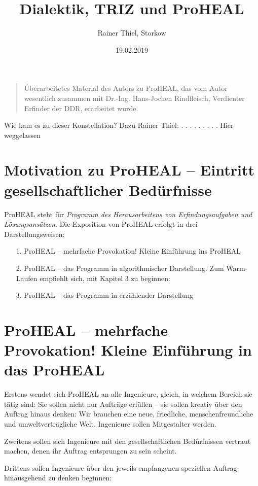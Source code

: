 \documentclass[12pt,a4paper]{article}
\title{Dialektik, TRIZ und ProHEAL}
\author{Rainer Thiel, Storkow}
\date{19.02.2019}
\begin{document}
\maketitle
\begin{quote}
  Überarbeitetes Material des Autors zu ProHEAL, das vom Autor wesentlich
  zusammen mit Dr.-Ing. Hans-Jochen Rindfleisch, Verdienter Erfinder der DDR,
  erarbeitet wurde.
\end{quote}
\tableofcontents

Wie kam es zu dieser Konstellation?
Dazu Rainer Thiel: . . . . . . . . . Hier weggelassen

\section*{Motivation zu ProHEAL -- Eintritt gesellschaftlicher Bedürfnisse}

ProHEAL steht für \emph{Programm des Herausarbeitens von Erfindungsaufgaben und
  Lösungsansätzen}. Die Exposition von ProHEAL erfolgt in drei
Darstellungsweisen:
\begin{itemize}
\item [1.] ProHEAL – mehrfache Provokation! Kleine Einführung ins ProHEAL
\item [2.] ProHEAL – das Programm in algorithmischer Darstellung. Zum
  Warm-Laufen empfiehlt sich, mit Kapitel 3 zu beginnen:
\item [3.] ProHEAL – das Programm in erzählender Darstellung
\end{itemize}

\section{ProHEAL – mehrfache Provokation! Kleine Einführung in das ProHEAL}

Erstens wendet sich ProHEAL an alle Ingenieure, gleich, in welchem Bereich sie
tätig sind: Sie sollen nicht nur Aufträge erfüllen – sie sollen kreativ über
den Auftrag hinaus denken: Wir brauchen eine neue, friedliche,
menschenfreundliche und umweltverträgliche Welt. Ingenieure sollen Mitgestalter
werden.

Zweitens sollen sich Ingenieure mit den gesellschaftlichen Bedürfnissen
vertraut machen, denen ihr Auftrag entsprungen zu sein scheint.

Drittens sollen Ingenieure über den jeweils empfangenen speziellen Auftrag
hinausgehend zu denken beginnen:
\end{document}
